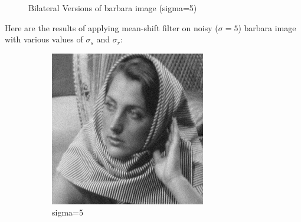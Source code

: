 \documentclass[12pt]{article}
\begin{document}
\begin{figure}[h]
    \caption{Bilateral Versions of barbara image (sigma=5)}
    \label{fig:overall}
\end{figure}


Here are the results of applying mean-shift filter on noisy ($\sigma = 5$) barbara image with various values of $\sigma_s$ and $\sigma_r$:

\begin{figure}[h]
    \centering
    \begin{subfigure}[b]{0.24\textwidth}
        \centering
        \includegraphics[width=\textwidth]{../images/noisy_barbara256.png}
        \caption{sigma=5}
        \label{Noisy (sigma=5)}
    \end{subfigure}
    \begin{subfigure}[b]{0.24\textwidth}
        \centering

\end{subfigure}
\end{figure}
\end{document}
